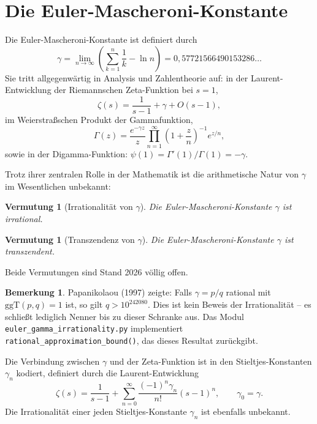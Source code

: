 \documentclass[12pt,a4paper]{amsart}
\newtheorem{conjecture}[theorem]{Vermutung}
\theoremstyle{definition}
\newtheorem{bemerkung}[theorem]{Bemerkung}
\newcommand{\ggT}{\mathrm{ggT}}
\begin{document}
\section{Die Euler-Mascheroni-Konstante}
\label{sec:euler-mascheroni}

Die Euler-Mascheroni-Konstante ist definiert durch
\[
  \gamma = \lim_{n \to \infty} \left( \sum_{k=1}^n \frac{1}{k} - \ln n \right)
  = 0{,}57721566490153286\ldots
\]
Sie tritt allgegenwärtig in Analysis und Zahlentheorie auf: in der
Laurent-Entwicklung der Riemannschen Zeta-Funktion bei $s = 1$,
\[
  \zeta(s) = \frac{1}{s-1} + \gamma + O(s-1),
\]
im Weierstraßschen Produkt der Gammafunktion,
\[
  \Gamma(z) = \frac{e^{-\gamma z}}{z} \prod_{n=1}^\infty
  \left(1 + \frac{z}{n}\right)^{-1} e^{z/n},
\]
sowie in der Digamma-Funktion: $\psi(1) = \Gamma'(1)/\Gamma(1) = -\gamma$.

Trotz ihrer zentralen Rolle in der Mathematik ist die arithmetische Natur
von $\gamma$ im Wesentlichen unbekannt:

\begin{conjecture}[Irrationalität von $\gamma$]
\label{verm:gamma-irr}
Die Euler-Mascheroni-Konstante $\gamma$ ist irrational.
\end{conjecture}

\begin{conjecture}[Transzendenz von $\gamma$]
\label{verm:gamma-transz}
Die Euler-Mascheroni-Konstante $\gamma$ ist transzendent.
\end{conjecture}

Beide Vermutungen sind Stand 2026 völlig offen.

\begin{bemerkung}
Papanikolaou (1997) zeigte: Falls $\gamma = p/q$ rational mit $\ggT(p,q) = 1$
ist, so gilt $q > 10^{242080}$. Dies ist kein Beweis der Irrationalität --
es schließt lediglich Nenner bis zu dieser Schranke aus. Das Modul
\texttt{euler\_gamma\_irrationality.py} implementiert
\texttt{rational\_approximation\_bound()}, das dieses Resultat zurückgibt.
\end{bemerkung}

Die Verbindung zwischen $\gamma$ und der Zeta-Funktion ist in den
Stieltjes-Konstanten $\gamma_n$ kodiert, definiert durch die Laurent-Entwicklung
\[
  \zeta(s) = \frac{1}{s-1} + \sum_{n=0}^\infty \frac{(-1)^n \gamma_n}{n!}
  (s-1)^n, \qquad \gamma_0 = \gamma.
\]
Die Irrationalität einer jeden Stieltjes-Konstante $\gamma_n$ ist ebenfalls
unbekannt.
\end{document}

